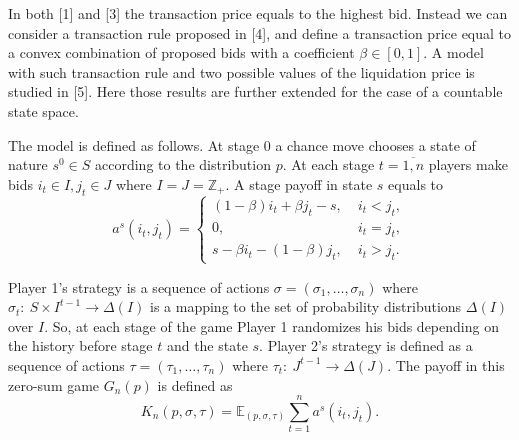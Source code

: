 In both [1] and [3] the transaction price equals to the highest bid. Instead we
can consider a transaction rule proposed in [4], and define a transaction price
equal to a convex combination of proposed bids with a coefficient $\beta \in [0,
1]$. A model with such transaction rule and two possible values of the
liquidation price is studied in [5]. Here those results are further extended for
the case of a countable state space.

The model is defined as follows. At stage 0 a chance move chooses a state of
nature $s^0 \in S$ according to the distribution $p$. At each stage $t =
\overline{1,n}$ players make bids $i_t \in I, j_t \in J$ where $I = J =
\mathbb{Z}_+$. A stage payoff in state $s$ equals to
\begin{equation*}
  a^s(i_t, j_t) =
  \begin{cases}
    (1-\beta) i_t + \beta j_t - s, &\; i_t < j_t,\\
    0, &\; i_t = j_t,\\
    s - \beta i_t - (1-\beta) j_t, &\; i_t > j_t.
  \end{cases}
\end{equation*}

Player 1's strategy is a sequence of actions $\sigma = (\sigma_1, \ldots,
\sigma_n)$ where $\sigma_t:~S \times I^{t-1} \rightarrow \Delta(I)$ is a mapping
to the set of probability distributions $\Delta(I)$ over $I$. So, at each stage
of the game Player 1 randomizes his bids depending on the history before stage
$t$ and the state $s$. Player 2's strategy is defined as a sequence of actions
$\tau = (\tau_1, \ldots, \tau_n)$ where $\tau_t:~J^{t-1} \rightarrow \Delta(J)$.
The payoff in this zero-sum game $G_n(p)$ is defined as
\begin{equation*}
  K_n(p, \sigma, \tau) = \mathbb{E}_{(p, \sigma, \tau)} \sum_{t=1}^n a^s(i_t,j_t).
\end{equation*}

